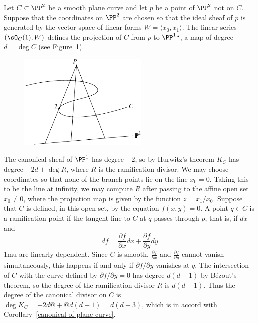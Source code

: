 \begin{example}
Let $C\subset \PP^2$ be a smooth plane curve and let $p$ be a point of $\PP^2$ not on $C$. Suppose that the coordinates on $\PP^2$ are chosen so that the ideal sheaf of $p$ is  
 generated by the vector space of linear forms $W = \langle x_0,x_1\rangle$. 
The linear series $(\sO_C(1), W)$ defines the projection of $C$ from $p$ to $\PP^1` `$, a map of degree
$d = \deg C$ (see Figure~\ref{projection of cubic}).

\begin{figure}   %
\centerline {\includegraphics[height=1.8in]{"main/Fig02-ProjectionPlaneCubic"}}
\label{projection of cubic}
\end{figure}

The canonical sheaf of $\PP^1$ has degree $-2$, so by Hurwitz's theorem
$K_C$ has degree $ -2d+ \deg R$, where $R$ is the 
ramification divisor. 
We may choose coordinates
so that none of the branch points lie on the line $x_0 = 0$. Taking this to be the line at infinity, we
may compute 
$R$
after passing to the affine open set $x_0\neq 0$, where the projection
map is given by the function $z = x_1/x_0$.  Suppose that $C$ is defined, in this open set,
by the equation $f(x,y)= 0$. A point $q\in C$ is a 
%
ramification
point if the tangent line to $C$ at $q$
passes through $p$, that is, if $dx$  and 
$$
df = \frac{\partial f}{\partial x} dx + \frac{\partial f}{\partial y} dy
$$
\medmuskip1mu
are linearly dependent.
Since $C$ is smooth, $\frac{\partial f}{\partial x} $ and $\frac{\partial f}{\partial y}$ cannot vanish
simultaneously,  this happens if and only if $\partial f/{\partial y}$ vanishes at $q$. The intersection of 
$C$ with the curve defined by $\partial f/{\partial y}=0$ has degree $d(d-1)$ by B\'ezout's theorem,
so the degree of the ramification divisor $R$ is $d(d-1)$. Thus the degree of the canonical
divisor on $C$ is $\deg K_C = -2d@+@d(d-1) = d(d-3)$, which is in accord with 
Corollary~\ref{canonical of plane curve}.
\end{example}

